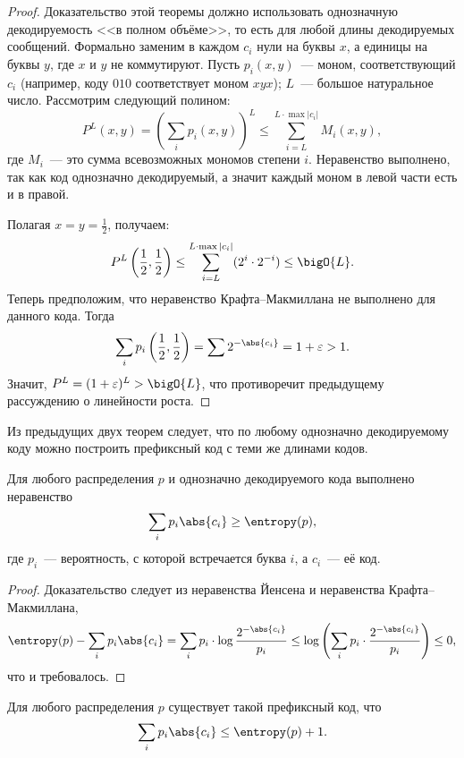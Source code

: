 \begin{proof}
    Доказательство этой теоремы должно использовать однозначную декодируемость <<в полном объёме>>, то
    есть для любой длины декодируемых сообщений. Формально заменим в каждом $c_i$ нули на буквы $x$, а
    единицы на буквы $y$, где $x$ и $y$ не коммутируют. Пусть $p_i(x, y)$~--- моном, соответствующий
    $c_i$ (например, коду $010$ соответствует моном $xyx$); $L$~--- большое натуральное число. Рассмотрим
    следующий полином:
    $$
        P^L(x, y) = \left(\sum_{i} p_i(x, y) \right)^L \le \sum_{i = L}^{L \cdot \max |c_i|} M_{i}(x, y),
    $$
    где $M_i$~--- это сумма всевозможных мономов степени $i$. Неравенство выполнено, так как код
    однозначно декодируемый, а значит каждый моном в левой части есть и в правой.

    Полагая $x = y = \frac{1}{2}$, получаем:
    $$
        P^L\left(\frac{1}{2},\frac{1}{2}\right) \le \sum_{i = L}^{L \cdot \max |c_i|}(2^i \cdot 2^{-i})
        \le \bigO{L}.
    $$
    Теперь предположим, что неравенство Крафта--Макмиллана не выполнено для данного кода. Тогда 
    $$
        \sum_i p_i\left(\frac{1}{2},\frac{1}{2}\right) = \sum 2^{-\abs{c_i}} = 1 + \varepsilon > 1.
    $$
    Значит, $P^L = (1 + \varepsilon)^{L} > \bigO{L}$, что противоречит предыдущему рассуждению о линейности
    роста.
\end{proof}

Из предыдущих двух теорем следует, что по любому однозначно декодируемому коду можно построить префиксный
код с теми же длинами кодов.

\begin{theorem}[Шеннон]
    Для любого распределения $p$ и однозначно декодируемого кода выполнено неравенство
    $$
        \sum_i p_i\abs{c_i} \ge \entropy(p),
    $$
    где $p_i$~--- вероятность, с которой встречается буква $i$, а $c_i$~--- её код. 
\end{theorem}

\begin{proof}
    Доказательство следует из неравенства Йенсена и неравенства Крафта--Макмиллана, 
    $$
        \entropy(p) - \sum_i p_i\abs{c_i} = \sum_i p_i \cdot \log\frac{2^{-\abs{c_i}}}{p_i}
            \le \log\left(\sum_i p_i \cdot \frac{2^{-\abs{c_i}}}{p_i} \right) \le 0,
    $$
    что и требовалось.
\end{proof}

\begin{theorem}
    \label{th:prefix-code}
    Для любого распределения $p$ существует такой префиксный код, что
    $$
        \sum_i p_i\abs{c_i} \le \entropy(p) + 1.
    $$
\end{theorem}

